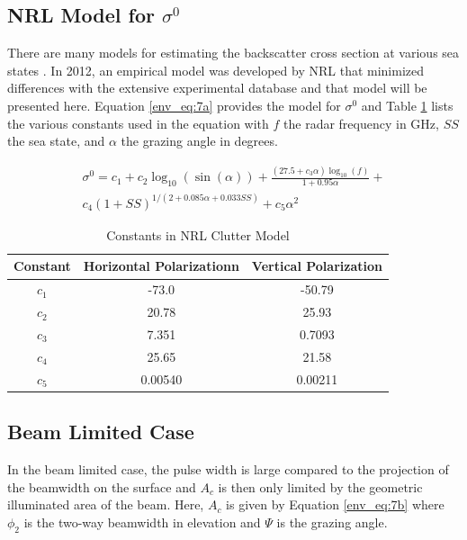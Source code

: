 \subsection{NRL Model for $\sigma^0$}
There are many models for estimating the backscatter cross section at various sea states \cite{blake_radar} \cite{richards_radar} \cite{nathanson_radar}. In 2012, an empirical model was developed by NRL that minimized differences with the extensive experimental database \cite{gregers-hansen_clutter} and that model will be presented here. Equation \ref{env_eq:7a} provides the model for $\sigma^0$ and Table \ref{env_tab:0} lists the various constants used in the equation with $f$ the radar frequency in GHz, $SS$ the sea state, and $\alpha$ the grazing angle in degrees.

\begin{equation}
\begin{gathered}
  \sigma^0 = c_1 + c_2 \log_{10}(\sin(\alpha))+\frac{\left(27.5 + c_3\alpha\right)\log_{10}(f)}{1+0.95\alpha}+\\
  c_4\left(1 + SS \right)^{1/\left(2+0.085\alpha + 0.033SS\right)}
 + c_5\alpha^2 
 \end{gathered}
 \label{env_eq:7a}
  \end{equation}
  
  \begin{table}[H]
  \begin{center}
      \renewcommand{\baselinestretch}{1} \small\normalsize
  \begin{quote}
    \caption[Constants in NRL Clutter Model]{Constants in NRL Clutter Model\label{env_tab:0}}
  \end{quote}
  \begin{tabular} {|c | c | c|}
    \hline
  \bf{Constant} & \bf{Horizontal Polarization}n & \bf{Vertical Polarization} \\ \hline
  $c_1$ & -73.0 & -50.79  \\ \hline
  $c_2$ & 20.78 & 25.93  \\ \hline
  $c_3$ & 7.351 & 0.7093 \\ \hline
  $c_4$ & 25.65 & 21.58  \\ \hline
  $c_5$ & 0.00540 & 0.00211 \\ \hline
\end{tabular}
\end{center}
\end{table}
\renewcommand{\baselinestretch}{2} \small\normalsize
  
\subsection{Beam Limited Case}
In the beam limited case, the pulse width is large compared to the projection of the beamwidth on the surface and $A_c$ is then only limited by the geometric illuminated area of the beam. Here, $A_c$ is given by Equation \ref{env_eq:7b} where $\phi_2$ is the two-way beamwidth  in elevation and $\Psi$ is the grazing angle.

